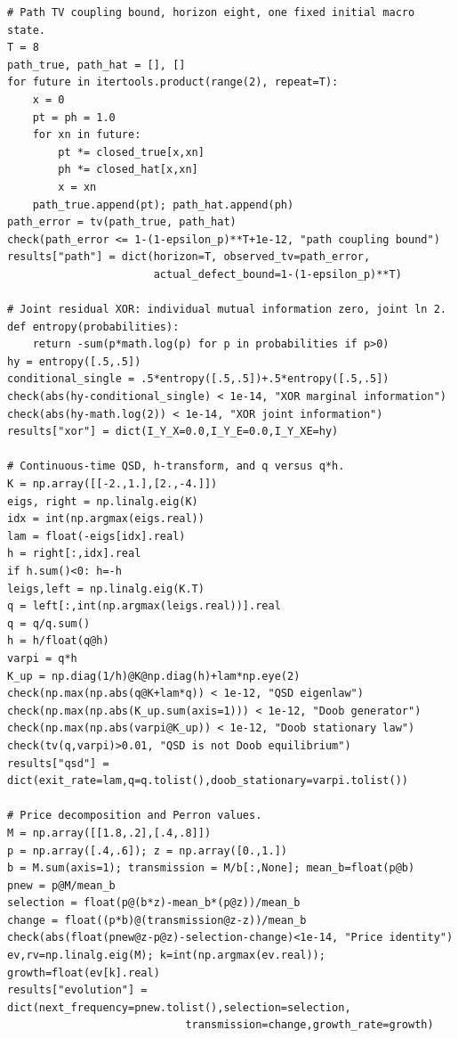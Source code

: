\documentclass[
  english,
  11pt,
  oneside]{book}
\begin{document}
\begin{verbatim}
# Path TV coupling bound, horizon eight, one fixed initial macro state.
T = 8
path_true, path_hat = [], []
for future in itertools.product(range(2), repeat=T):
    x = 0
    pt = ph = 1.0
    for xn in future:
        pt *= closed_true[x,xn]
        ph *= closed_hat[x,xn]
        x = xn
    path_true.append(pt); path_hat.append(ph)
path_error = tv(path_true, path_hat)
check(path_error <= 1-(1-epsilon_p)**T+1e-12, "path coupling bound")
results["path"] = dict(horizon=T, observed_tv=path_error,
                       actual_defect_bound=1-(1-epsilon_p)**T)

# Joint residual XOR: individual mutual information zero, joint ln 2.
def entropy(probabilities):
    return -sum(p*math.log(p) for p in probabilities if p>0)
hy = entropy([.5,.5])
conditional_single = .5*entropy([.5,.5])+.5*entropy([.5,.5])
check(abs(hy-conditional_single) < 1e-14, "XOR marginal information")
check(abs(hy-math.log(2)) < 1e-14, "XOR joint information")
results["xor"] = dict(I_Y_X=0.0,I_Y_E=0.0,I_Y_XE=hy)

# Continuous-time QSD, h-transform, and q versus q*h.
K = np.array([[-2.,1.],[2.,-4.]])
eigs, right = np.linalg.eig(K)
idx = int(np.argmax(eigs.real))
lam = float(-eigs[idx].real)
h = right[:,idx].real
if h.sum()<0: h=-h
leigs,left = np.linalg.eig(K.T)
q = left[:,int(np.argmax(leigs.real))].real
q = q/q.sum()
h = h/float(q@h)
varpi = q*h
K_up = np.diag(1/h)@K@np.diag(h)+lam*np.eye(2)
check(np.max(np.abs(q@K+lam*q)) < 1e-12, "QSD eigenlaw")
check(np.max(np.abs(K_up.sum(axis=1))) < 1e-12, "Doob generator")
check(np.max(np.abs(varpi@K_up)) < 1e-12, "Doob stationary law")
check(tv(q,varpi)>0.01, "QSD is not Doob equilibrium")
results["qsd"] = dict(exit_rate=lam,q=q.tolist(),doob_stationary=varpi.tolist())

# Price decomposition and Perron values.
M = np.array([[1.8,.2],[.4,.8]])
p = np.array([.4,.6]); z = np.array([0.,1.])
b = M.sum(axis=1); transmission = M/b[:,None]; mean_b=float(p@b)
pnew = p@M/mean_b
selection = float(p@(b*z)-mean_b*(p@z))/mean_b
change = float((p*b)@(transmission@z-z))/mean_b
check(abs(float(pnew@z-p@z)-selection-change)<1e-14, "Price identity")
ev,rv=np.linalg.eig(M); k=int(np.argmax(ev.real)); growth=float(ev[k].real)
results["evolution"] = dict(next_frequency=pnew.tolist(),selection=selection,
                            transmission=change,growth_rate=growth)


\end{verbatim}
\end{document}
